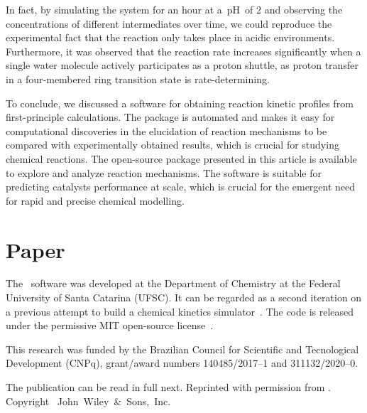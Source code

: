 In fact,
by simulating the system for an hour at a~pH~of 2
and observing the concentrations of different intermediates over time,
we could reproduce the experimental fact that
the reaction only takes place in acidic environments.
Furthermore,
it was observed that the reaction rate increases significantly when
a single water molecule actively participates as a proton shuttle,
as proton transfer in a four-membered ring transition state is rate-determining.

To conclude,
we discussed a software for obtaining reaction kinetic profiles from first-principle calculations.
The package is automated and makes it easy for computational discoveries in the elucidation of reaction mechanisms
to be compared with experimentally obtained results,
which is crucial for studying chemical reactions.
The open-source package presented in this article is available to explore and analyze reaction mechanisms.
The software is suitable for predicting catalysts performance at scale,
which is crucial for the emergent need for rapid and precise chemical modelling.

\section{Paper}

The \overreact{}~software was developed at the Department of Chemistry at the Federal University of Santa Catarina (UFSC).
It can be regarded as a second iteration on a previous attempt to build a chemical kinetics simulator~\cite{pyrrole2019zenodo}.
The code is released under the permissive MIT open-source license~\cite{MITLicense}.

This research was funded by the Brazilian Council for Scientific and Tecnological Development (CNPq),
grant/award numbers 140485/2017--1 and 311132/2020--0.

The publication can be read in full next.
Reprinted with permission from
.
Copyright~\citeyear{Schneider_2022}
John~Wiley~\&~Sons,~Inc.


